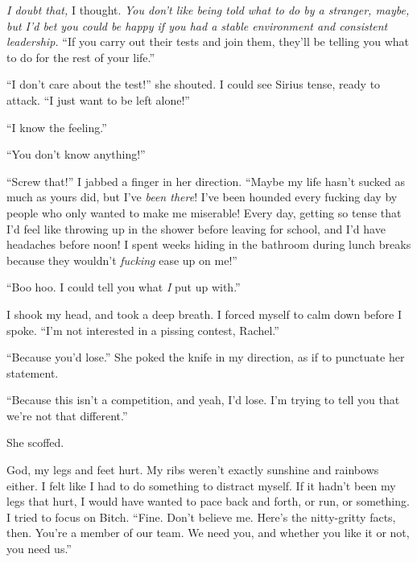 \emph{I doubt that, }I thought.  \emph{You don't like being told what to do by a stranger, maybe, but I'd bet you could be happy if you had a stable environment and consistent leadership.  }``If you carry out their tests and join them, they'll be telling you what to do for the rest of your life.''



``I don't care about the test!'' she shouted.  I could see Sirius tense, ready to attack.  ``I just want to be left alone!''



``I know the feeling.''



``You don't know anything!''



``Screw that!''  I jabbed a finger in her direction.  ``Maybe my life hasn't sucked as much as yours did, but I've \emph{been there}!  I've been hounded every fucking day by people who only wanted to make me miserable!  Every day, getting so tense that I'd feel like throwing up in the shower before leaving for school, and I'd have headaches before noon!  I spent weeks hiding in the bathroom during lunch breaks because they wouldn't \emph{fucking} ease up on me!''



``Boo hoo.  I could tell you what \emph{I} put up with.''



I shook my head, and took a deep breath.  I forced myself to calm down before I spoke.  ``I'm not interested in a pissing contest, Rachel.''



``Because you'd lose.''  She poked the knife in my direction, as if to punctuate her statement.



``Because this isn't a competition, and yeah, I'd lose.  I'm trying to tell you that we're not that different.''



She scoffed.



God, my legs and feet hurt.  My ribs weren't exactly sunshine and rainbows either.  I felt like I had to do something to distract myself.  If it hadn't been my legs that hurt, I would have wanted to pace back and forth, or run, or something.  I tried to focus on Bitch.  ``Fine.  Don't believe me.  Here's the nitty-gritty facts, then.  You're a member of our team.  We need you, and whether you like it or not, you need us.''



